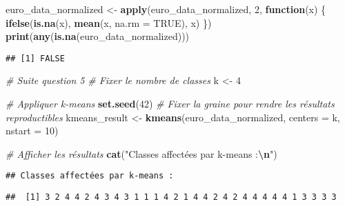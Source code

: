 \documentclass[
]{article}
\newenvironment{Shaded}{\begin{snugshade}}{\end{snugshade}}
\newcommand{\AttributeTok}[1]{\textcolor[rgb]{0.13,0.29,0.53}{#1}}
\newcommand{\CommentTok}[1]{\textcolor[rgb]{0.56,0.35,0.01}{\textit{#1}}}
\newcommand{\ConstantTok}[1]{\textcolor[rgb]{0.56,0.35,0.01}{#1}}
\newcommand{\ControlFlowTok}[1]{\textcolor[rgb]{0.13,0.29,0.53}{\textbf{#1}}}
\newcommand{\DecValTok}[1]{\textcolor[rgb]{0.00,0.00,0.81}{#1}}
\newcommand{\FunctionTok}[1]{\textcolor[rgb]{0.13,0.29,0.53}{\textbf{#1}}}
\newcommand{\NormalTok}[1]{#1}
\newcommand{\OtherTok}[1]{\textcolor[rgb]{0.56,0.35,0.01}{#1}}
\newcommand{\SpecialCharTok}[1]{\textcolor[rgb]{0.81,0.36,0.00}{\textbf{#1}}}
\newcommand{\StringTok}[1]{\textcolor[rgb]{0.31,0.60,0.02}{#1}}
\begin{document}
\begin{Shaded}
\begin{Highlighting}[]
\NormalTok{euro\_data\_normalized }\OtherTok{\textless{}{-}} \FunctionTok{apply}\NormalTok{(euro\_data\_normalized, }\DecValTok{2}\NormalTok{, }\ControlFlowTok{function}\NormalTok{(x) \{}
  \FunctionTok{ifelse}\NormalTok{(}\FunctionTok{is.na}\NormalTok{(x), }\FunctionTok{mean}\NormalTok{(x, }\AttributeTok{na.rm =} \ConstantTok{TRUE}\NormalTok{), x)}
\NormalTok{\})}
\FunctionTok{print}\NormalTok{(}\FunctionTok{any}\NormalTok{(}\FunctionTok{is.na}\NormalTok{(euro\_data\_normalized)))}
\end{Highlighting}
\end{Shaded}

\begin{verbatim}
## [1] FALSE
\end{verbatim}

\begin{Shaded}
\begin{Highlighting}[]
\CommentTok{\# Suite question 5 }
\CommentTok{\# Fixer le nombre de classes}
\NormalTok{k }\OtherTok{\textless{}{-}} \DecValTok{4}

\CommentTok{\# Appliquer k{-}means}
\FunctionTok{set.seed}\NormalTok{(}\DecValTok{42}\NormalTok{)  }\CommentTok{\# Fixer la graine pour rendre les résultats reproductibles}
\NormalTok{kmeans\_result }\OtherTok{\textless{}{-}} \FunctionTok{kmeans}\NormalTok{(euro\_data\_normalized, }\AttributeTok{centers =}\NormalTok{ k, }\AttributeTok{nstart =} \DecValTok{10}\NormalTok{)}

\CommentTok{\# Afficher les résultats}
\FunctionTok{cat}\NormalTok{(}\StringTok{"Classes affectées par k{-}means :}\SpecialCharTok{\textbackslash{}n}\StringTok{"}\NormalTok{)}
\end{Highlighting}
\end{Shaded}

\begin{verbatim}
## Classes affectées par k-means :
\end{verbatim}

\begin{Shaded}
\end{Shaded}

\begin{verbatim}
##  [1] 3 2 4 4 2 4 3 4 3 1 1 1 4 2 1 4 4 2 4 2 4 4 4 4 4 1 3 3 3 3
\end{verbatim}
\end{document}
